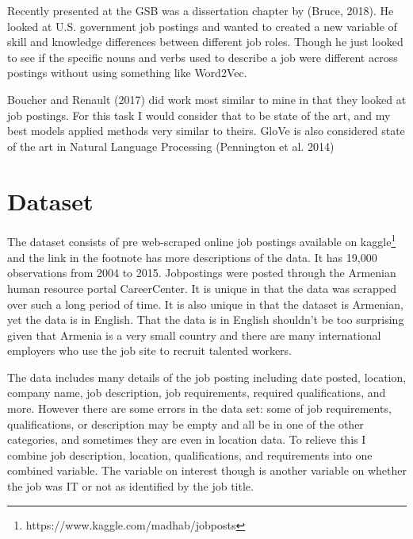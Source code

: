 \documentclass[11pt, oneside]{article}   	%
\begin{document}
Recently presented at the GSB was a dissertation chapter by (Bruce, 2018). He looked at U.S. government job postings and wanted to created a new variable of skill and knowledge differences between different job roles. Though he just looked to see if the specific nouns and verbs used to describe a job were different across postings without using something like Word2Vec.

Boucher and Renault (2017) did work most similar to mine in that they looked at job postings. For this task I would consider that to be state of the art, and my best models applied methods very similar to theirs. GloVe is also considered state of the art in Natural Language Processing (Pennington et al. 2014)


\section{Dataset}
The dataset consists of pre web-scraped online job postings available on kaggle\footnote{https://www.kaggle.com/madhab/jobposts} and the link in the footnote has more descriptions of the data. It has 19,000 observations from 2004 to 2015. Jobpostings  were posted through the Armenian human resource portal CareerCenter. %
 It is unique in that the data was scrapped over such a long period of time. It is also unique in that the dataset is Armenian, yet the data is in English. That the data is in English shouldn't be too surprising  given that Armenia is a very small country and there are many international employers who use the job site to recruit talented workers. 

The data includes many details of the job posting including date posted, location, company name, job description, job requirements, required qualifications, and more. However there are some errors in the data set: some of job requirements, qualifications, or description may be empty and all be in one of the other categories, and sometimes they are even in location data. To relieve this I combine job description, location, qualifications, and requirements into one combined variable. The variable on interest though is another  variable on whether the job was IT or not as identified by the job title.
\end{document}
